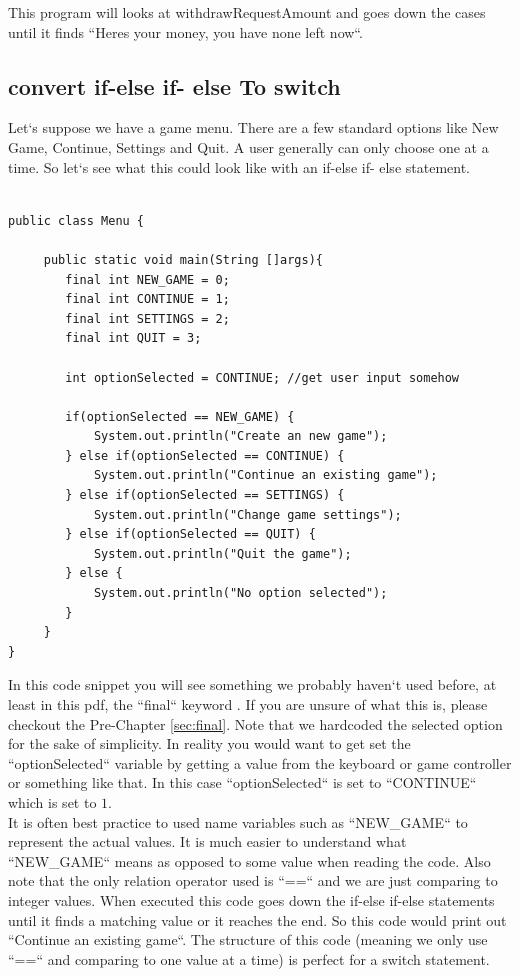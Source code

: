 \documentclass[11]{article}
\begin{document}
This program will looks at withdrawRequestAmount and goes down the cases until it finds ``Heres your money, you have none left now``. 

\subsection{convert if-else if- else To switch}
Let`s suppose we have a game menu. There are a few standard options like New Game, Continue, Settings and Quit. A user generally can only choose one at a time. So let`s see what this could look like with an if-else if- else statement.

\begin{lstlisting}

public class Menu {

     public static void main(String []args){
        final int NEW_GAME = 0;
        final int CONTINUE = 1;
        final int SETTINGS = 2;
        final int QUIT = 3;
        
        int optionSelected = CONTINUE; //get user input somehow
        
        if(optionSelected == NEW_GAME) {
            System.out.println("Create an new game");
        } else if(optionSelected == CONTINUE) {
            System.out.println("Continue an existing game");
        } else if(optionSelected == SETTINGS) {
            System.out.println("Change game settings");
        } else if(optionSelected == QUIT) {
            System.out.println("Quit the game");
        } else {
            System.out.println("No option selected");
        }
     }
}
\end{lstlisting}
In this code snippet you will see something we probably haven`t used before, at least in this pdf, the ``final`` keyword . If you are unsure of what this is, please checkout the Pre-Chapter \autoref{sec:final}. Note that we hardcoded the selected option for the sake of simplicity. In reality you would want to get set the  ``optionSelected`` variable by getting a value from the keyboard or game controller or something like that. In this case ``optionSelected`` is set to ``CONTINUE`` which is set to $1$. \\ 

It is often best practice to used name variables such as ``NEW{\_}GAME`` to represent the actual values. It is much easier to understand what ``NEW{\_}GAME`` means as opposed to some value when reading the code. Also note that the only relation operator used is ``==`` and we are just comparing to integer values. When executed this code goes down the if-else if-else statements until it finds a matching value or it reaches the end. So this code would print out ``Continue an existing game``.  The structure of this code (meaning we only use ``==`` and comparing to one value at a time) is perfect for a switch statement.\\
\end{document}
